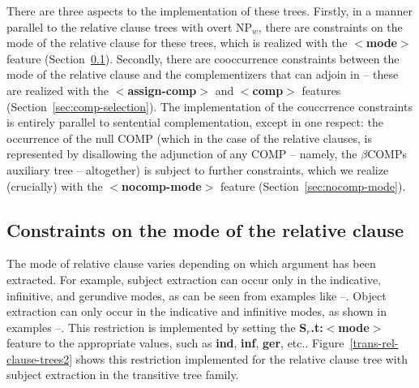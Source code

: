 \begin{\itemize}
There are three aspects to the implementation of these trees. Firstly, in a
manner parallel to the relative clause trees with overt NP$_w$, there are
constraints on the mode of the relative clause for these trees, which is
realized with the {\bf $<$mode$>$} feature
(Section~\ref{sec:clause-mode}). Secondly, there are cooccurrence constraints
between the mode of the relative clause and the complementizers that can
adjoin in -- these are realized with the {\bf $<$assign-comp$>$} and {\bf
$<$comp$>$} features (Section~\ref{sec:comp-selection}). The implementation of
the couccrrence constraints is entirely parallel to sentential
complementation, except in one respect: the occurrence of the null COMP
(which in the case of the relative clauses, is represented by disallowing
the adjunction of any COMP -- namely, the $\beta$COMPs auxiliary tree --
altogether) is subject to further constraints, which we realize (crucially)
with the {\bf $<$nocomp-mode$>$} feature (Section~\ref{sec:nocomp-mode}).

\subsection{Constraints on the mode of the relative clause}
\label{sec:clause-mode}

The mode of relative clause varies depending on which argument has been
extracted. For example, subject extraction can occur only in the
indicative, infinitive, and gerundive modes, as can be seen from examples
like --. Object extraction can only occur in the indicative and
infinitive modes, as shown in examples --. This restriction is
implemented by setting the {\bf S$_r$.t:$<$mode$>$} feature to the
appropriate values, such as {\bf ind}, {\bf inf}, {\bf ger},
etc.. Figure~\ref{trans-rel-clause-trees2} shows this restriction
implemented for the relative clause tree with subject extraction in the
transitive tree family.



\end{\itemize}
